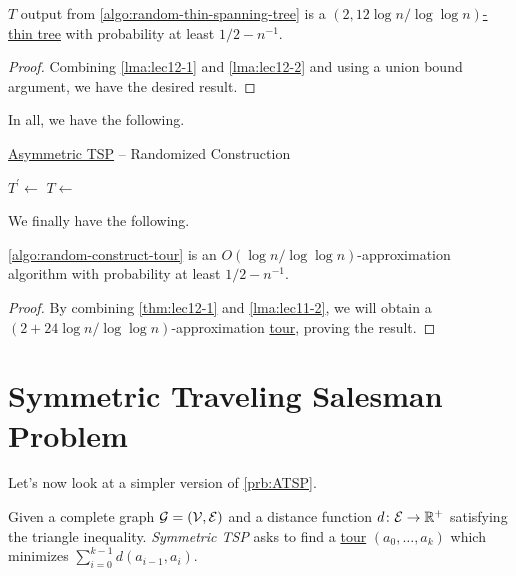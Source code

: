 \begin{theorem}\label{thm:lec12-1}
	\(T\) output from \autoref{algo:random-thin-spanning-tree} is a \hyperref[def:thin]{\((2, 12\log n / \log \log n)\)-thin tree} with probability at least \(1 / 2 - n^{-1} \).
\end{theorem}
\begin{proof}
	Combining \autoref{lma:lec12-1} and \autoref{lma:lec12-2} and using a union bound argument, we have the desired result.
\end{proof}

In all, we have the following.

\begin{algorithm}[H]\label{algo:random-construct-tour}
	\DontPrintSemicolon
	\caption{\hyperref[prb:ATSP]{Asymmetric TSP} -- Randomized Construction}
	\BlankLine
	\(T^\prime\gets\)\;
	\(T\gets\)\;
	\;
\end{algorithm}

We finally have the following.

\begin{theorem}
	\autoref{algo:random-construct-tour} is an \(O(\log n / \log \log n)\)-approximation algorithm with probability at least \(1 / 2 - n ^{-1} \).
\end{theorem}
\begin{proof}
	By combining \autoref{thm:lec12-1} and \autoref{lma:lec11-2}, we will obtain a \((2 + 24\log n / \log \log n)\)-approximation \hyperref[def:tour]{tour}, proving the result.
\end{proof}


\section{Symmetric Traveling Salesman Problem}
Let's now look at a simpler version of \autoref{prb:ATSP}.

\begin{problem}\label{prb:STSP}
Given a complete graph \(\mathcal{\MakeUppercase{g}} =(\mathcal{\MakeUppercase{v}} , \mathcal{\MakeUppercase{e}} )\) and a distance function \(d\colon \mathcal{\MakeUppercase{e}} \to \mathbb{\MakeUppercase{r}} ^+\) satisfying the triangle inequality. \emph{Symmetric TSP} asks to find a \hyperref[def:tour]{tour} \((a_0, \ldots , a_k)\) which minimizes \(\sum_{i=0} ^{k-1}d(a_{i-1}, a_i)\).
\end{problem}

